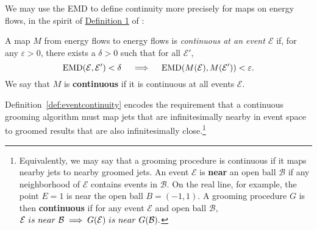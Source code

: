 We may use the EMD to define continuity more precisely for maps on energy flows, in the spirit of \href{https://arxiv.org/pdf/2004.04159.pdf#page=5\&zoom=100,0,350}{Definition 1} of :
%
\begin{definition}\label{def:eventcontinuity}
A map \(M\) from energy flows to energy flows is \textit{continuous at an event \(\mathcal E\)} if, for any \(\varepsilon > 0\), there exists a \(\delta > 0\) such that for all \(\mathcal E'\),
%
\begin{equation*}\label{eqn:emdcontinuity}
    {\rm EMD}(\mathcal E,\mathcal E')<\delta
    \quad\implies\quad
    {\rm EMD}(M(\mathcal E), M(\mathcal E')) < \varepsilon.
\end{equation*}
%
We say that \(M\) is \textbf{continuous} if it is continuous at all events \(\mathcal{E}\).
\end{definition}
%
\noindent Definition~\ref{def:eventcontinuity} encodes the requirement that a continuous grooming algorithm must map jets that are infinitesimally nearby in event space to groomed results that are also infinitesimally close.\footnote{
Equivalently, we may say that a grooming procedure is continuous if it maps nearby jets to nearby groomed jets.
%
An event \(\mathcal{E}\) is \textbf{near} an open ball \(\mathcal{B}\) if any neighborhood of \(\mathcal{E}\) contains events in \(\mathcal{B}\).
%
On the real line, for example, the point \(E = 1\) is near the open ball \(B = (-1, 1)\).
%
A grooming procedure \(G\) is then \textbf{continuous} if for any event \(\mathcal{E}\) and open ball \(\mathcal{B}\),
    \(
    \mathcal{E} {\text ~is~ near~} \mathcal{B}
    \implies
    G(\mathcal{E}) {\text~ is~ near~} G(\mathcal{B}).
    \)
}

